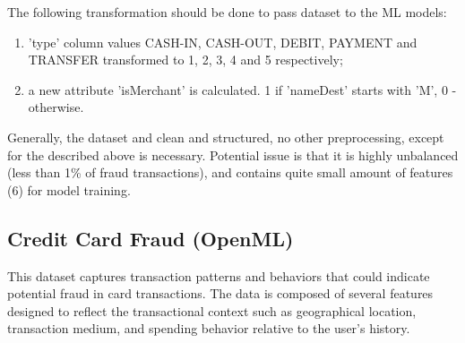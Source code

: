 \documentclass[12pt,a4paper, hidelinks]{article}
\begin{document}
The following transformation should be done to pass dataset to the ML models:
\begin{enumerate}
    \item 'type' column values CASH-IN, CASH-OUT, DEBIT, PAYMENT and TRANSFER transformed to 1, 2, 3, 4 and 5 respectively;
    \item a new attribute 'isMerchant' is calculated. 1 if 'nameDest' starts with 'M', 0 - otherwise.
\end{enumerate}

Generally, the dataset and clean and structured, no other preprocessing, except for the described above is necessary. Potential issue is that it is highly unbalanced (less than 1\% of fraud transactions), and contains quite small amount of features (6) for model training. 


\subsection{Credit Card Fraud (OpenML)}

This dataset captures transaction patterns and behaviors that could indicate potential fraud in card transactions. The data is composed of several features designed to reflect the transactional context such as geographical location, transaction medium, and spending behavior relative to the user's history.
\end{document}
